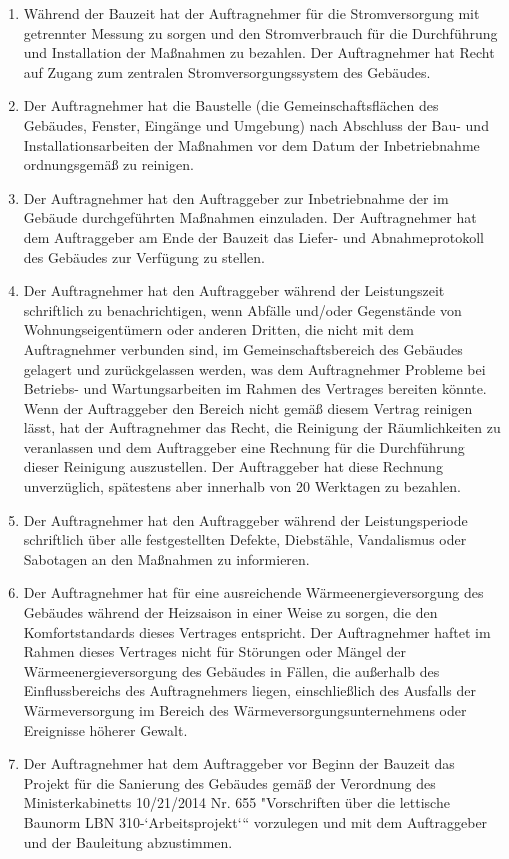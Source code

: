 \begin{multicols}{2}
\begin{enumerate}
   \item Während der Bauzeit hat der Auftragnehmer für die Stromversorgung mit getrennter Messung zu sorgen und den Stromverbrauch für die Durchführung und Installation der Maßnahmen zu bezahlen. Der Auftragnehmer hat Recht auf Zugang zum zentralen Stromversorgungssystem des Gebäudes.
   \item Der Auftragnehmer hat die Baustelle (die Gemeinschaftsflächen des Gebäudes, Fenster, Eingänge und Umgebung) nach Abschluss der Bau- und Installationsarbeiten der Maßnahmen vor dem Datum der Inbetriebnahme ordnungsgemäß zu reinigen.
   \item Der Auftragnehmer hat den Auftraggeber zur Inbetriebnahme der im Gebäude durchgeführten Maßnahmen einzuladen. Der Auftragnehmer hat dem Auftraggeber am Ende der Bauzeit das Liefer- und Abnahmeprotokoll des Gebäudes zur Verfügung zu stellen.
   \item Der Auftragnehmer hat den Auftraggeber während der Leistungszeit schriftlich zu benachrichtigen, wenn Abfälle und/oder Gegenstände von Wohnungseigentümern oder anderen Dritten, die nicht mit dem Auftragnehmer verbunden sind, im Gemeinschaftsbereich des Gebäudes gelagert und zurückgelassen werden, was dem Auftragnehmer Probleme bei Betriebs- und Wartungsarbeiten im Rahmen des Vertrages bereiten könnte. Wenn der Auftraggeber den Bereich nicht gemäß diesem Vertrag reinigen lässt, hat der Auftragnehmer das Recht, die Reinigung der Räumlichkeiten zu veranlassen und dem Auftraggeber eine Rechnung für die Durchführung dieser Reinigung auszustellen. Der Auftraggeber hat diese Rechnung unverzüglich, spätestens aber innerhalb von 20 Werktagen zu bezahlen.
   \item Der Auftragnehmer hat den Auftraggeber während der Leistungsperiode schriftlich über alle festgestellten Defekte, Diebstähle, Vandalismus oder Sabotagen an den Maßnahmen zu informieren.
   \item Der Auftragnehmer hat für eine ausreichende Wärmeenergieversorgung des Gebäudes während der Heizsaison in einer Weise zu sorgen, die den Komfortstandards dieses Vertrages entspricht. Der Auftragnehmer haftet im Rahmen dieses Vertrages nicht für Störungen oder Mängel der Wärmeenergieversorgung des Gebäudes in Fällen, die außerhalb des Einflussbereichs des Auftragnehmers liegen, einschließlich des Ausfalls der Wärmeversorgung im Bereich des Wärmeversorgungsunternehmens oder Ereignisse  höherer Gewalt.
   \item Der Auftragnehmer hat dem Auftraggeber vor Beginn der Bauzeit das Projekt für die Sanierung des Gebäudes gemäß der Verordnung des Ministerkabinetts 10/21/2014 Nr. 655 "Vorschriften über die lettische Baunorm LBN 310-‘Arbeitsprojekt‘“ vorzulegen und mit dem Auftraggeber und der Bauleitung abzustimmen.

\end{enumerate}
\end{multicols}
